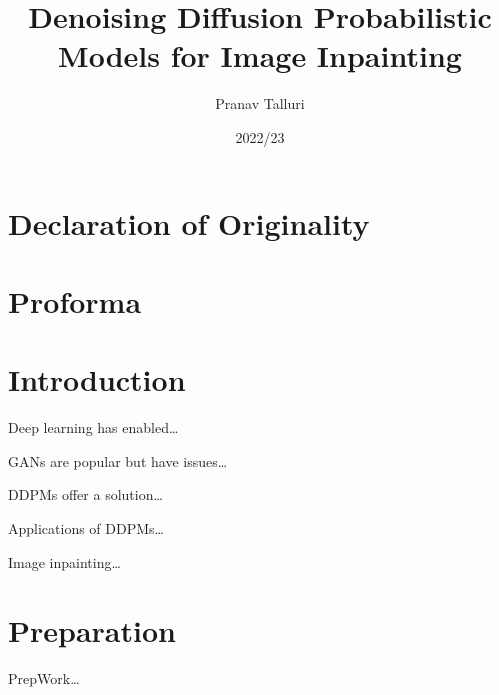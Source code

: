 \documentclass{article}
\title{Denoising Diffusion Probabilistic Models for Image Inpainting}
\author{Pranav Talluri}
\date{2022/23}
\begin{document}
\maketitle
\newpage
\section*{Declaration of Originality}
\newpage
\section*{Proforma}
\newpage
\tableofcontents
\newpage
\section{Introduction}

Deep learning has enabled\dots

GANs are popular but have issues\dots

DDPMs offer a solution\dots

Applications of DDPMs\dots

Image inpainting\dots

\newpage
\section{Preparation}

PrepWork\dots
\end{document}
